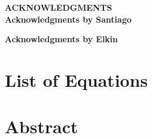 \documentclass[11pt]{report} %
\begin{document}
\begin{titlepage}
\begin{center}

\begin{Large}

\vspace*{1cm}
\textbf{ACKNOWLEDGMENTS}\\[3.5cm]

\textbf{Acknowledgments by Santiago}\\

\end{Large}

\begin{Large}

\vspace*{3cm}

\textbf{Acknowledgments by Elkin}\\

\end{Large}

\vfill

\end{center}
\end{titlepage}



\tableofcontents




\cleardoublepage
\listoffigures


\cleardoublepage
\listoftables


\cleardoublepage
\chapter*{List of Equations}

\listofmyequations


\chapter*{Abstract}
\end{document}
